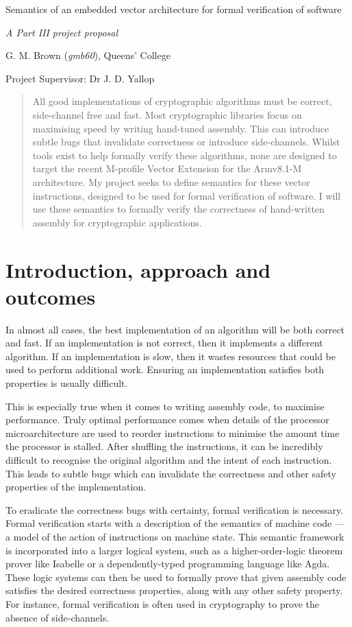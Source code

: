 \documentclass[11pt]{article}
\date{}
\title{}
\begin{document}
\centerline{\Large Semantics of an embedded vector architecture for formal verification of software}
\vspace{2em}
\centerline{\Large \emph{A Part III project proposal}}
\vspace{2em}
\centerline{\large G. M. Brown (\emph{gmb60}), Queens' College}
\vspace{1em}
\centerline{\large Project Supervisor: Dr J. D. Yallop}
\vspace{1em}

\begin{abstract}
All good implementations of cryptographic algorithms must be correct,
side-channel free and fast. Most cryptographic libraries focus on maximising 
speed by writing hand-tuned assembly. This can introduce subtle bugs that
invalidate correctness or introduce side-channels. Whilst tools exist to help
formally verify these algorithms, none are designed to target the recent
M-profile Vector Extension for the Armv8.1-M architecture. My project seeks to
define semantics for these vector instructions, designed to be used for formal
verification of software. I will use these semantics to formally verify the
correctness of hand-written assembly for cryptographic applications.
\end{abstract}

\section{Introduction, approach and outcomes}
\label{sec:org73235ed}

In almost all cases, the best implementation of an algorithm will be both
correct and fast. If an implementation is not correct, then it implements a
different algorithm. If an implementation is slow, then it wastes resources
that could be used to perform additional work. Ensuring an implementation
satisfies both properties is usually difficult.

This is especially true when it comes to writing assembly code, to maximise
performance. Truly optimal performance comes when details of the processor
microarchitecture are used to reorder instructions to minimise the amount time
the processor is stalled. After shuffling the instructions, it can be
incredibly difficult to recognise the original algorithm and the intent of
each instruction. This leads to subtle bugs which can invalidate the
correctness and other safety properties of the implementation.

To eradicate the correctness bugs with certainty, formal verification is
necessary. Formal verification starts with a description of the semantics of
machine code --- a model of the action of instructions on machine state. This
semantic framework is incorporated into a larger logical system, such as a
higher-order-logic theorem prover like Isabelle or a dependently-typed
programming language like Agda. These logic systems can then be used to
formally prove that given assembly code satisfies the desired correctness
properties, along with any other safety property. For instance, formal
verification is often used in cryptography to prove the absence of
side-channels.
\end{document}
